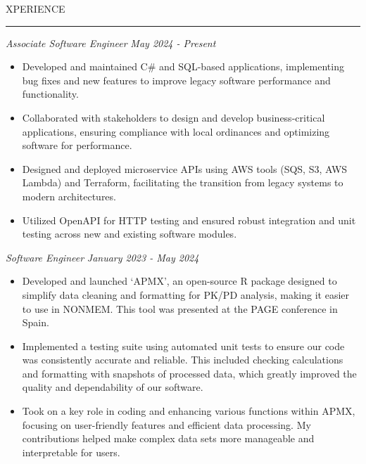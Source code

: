 \documentclass[11pt]{article}
\begin{document}
\par \scalebox{1.3}{E}XPERIENCE                    
\par \vspace{-0.1in} \noindent\rule{7.8in}{0.5pt} 
\textbf{\scalebox{1.2}{Hagerty}} \hfill \scalebox{1.1}{Traverse City, Michigan (Remote)}
\par \textit{Associate Software Engineer} \hfill \textit{May 2024 - Present}
{\small
\begin{itemize}
    \item Developed and maintained C\# and SQL-based applications, implementing bug fixes and new features to improve legacy software performance and functionality.
    \item Collaborated with stakeholders to design and develop business-critical applications, ensuring compliance with local ordinances and optimizing software for performance.
    \item Designed and deployed microservice APIs using AWS tools (SQS, S3, AWS Lambda) and Terraform, facilitating the transition from legacy systems to modern architectures.
    \item Utilized OpenAPI for HTTP testing and ensured robust integration and unit testing across new and existing software modules.
\end{itemize}
}
\textbf{\scalebox{1.2}{Amador Bioscience}} \hfill \scalebox{1.1}{Ann Arbor, Michigan}
\par \textit{Software Engineer} \hfill \textit{January 2023 - May 2024}
{\small
\begin{itemize}
    \item Developed and launched `APMX', an open-source R package designed to simplify data cleaning and formatting for PK/PD analysis, making it easier to use in NONMEM. This tool was presented at the PAGE conference in Spain.
    \item Implemented a testing suite using automated unit tests to ensure our code was consistently accurate and reliable. This included checking calculations and formatting with snapshots of processed data, which greatly improved the quality and dependability of our software.
    \item Took on a key role in coding and enhancing various functions within APMX, focusing on user-friendly features and efficient data processing. My contributions helped make complex data sets more manageable and interpretable for users.
\end{itemize}
}
\end{document}
